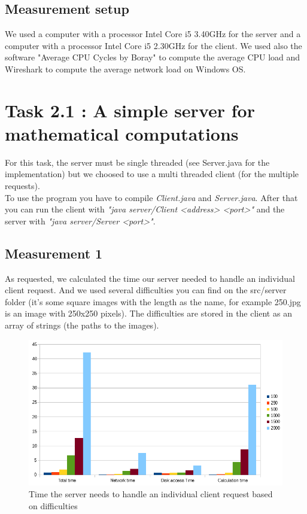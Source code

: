 \documentclass[11pt,a4paper]{article}
\begin{document}
\subsection{Measurement setup}

We used a computer with a processor Intel Core i5 3.40GHz for the server and a computer with a processor Intel Core i5 2.30GHz for the client. We used also the software "Average CPU Cycles by Boray" to compute the average CPU load and Wireshark to compute the average network load on Windows OS.

\section{Task 2.1 : A simple server for mathematical computations}

For this task, the server must be single threaded (see Server.java for the implementation) but we choosed to use a multi threaded client (for the multiple requests).\\
To use the program you have to compile \textit{Client.java} and \textit{Server.java}. After that you can run the client with \textit{"java server/Client <address> <port>"} and the server with \textit{"java server/Server <port>"}.

\subsection{Measurement 1}

As requested, we calculated the time our server needed to handle an individual client request. And we used several difficulties you can find on the src/server folder (it's some square images with the length as the name, for example 250.jpg is an image with 250x250 pixels). The difficulties are stored in the client as an array of strings (the paths to the images).

\begin{figure}[h!]
\centering
\includegraphics[width=14cm]{measurement1.png}
\caption{Time the server needs to handle an individual client request based on difficulties}
\end{figure}
\end{document}
